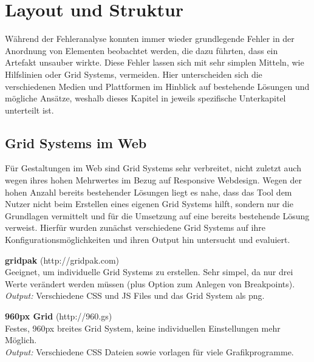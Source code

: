 
\chapter{Layout und Struktur} %

\label{LayoutStruktur} %



Während der Fehleranalyse konnten immer wieder grundlegende Fehler in der Anordnung von Elementen beobachtet werden, die dazu führten, dass ein Artefakt unsauber wirkte.
Diese Fehler lassen sich mit sehr simplen Mitteln, wie Hilfslinien oder Grid Systems, vermeiden.
Hier unterscheiden sich die verschiedenen Medien und Plattformen im Hinblick auf bestehende Lösungen und mögliche Ansätze, weshalb dieses Kapitel in jeweils spezifische Unterkapitel unterteilt ist.

\section{Grid Systems im Web}
Für Gestaltungen im Web sind Grid Systems sehr verbreitet, nicht zuletzt auch wegen ihres hohen Mehrwertes im Bezug auf Responsive Webdesign.
Wegen der hohen Anzahl bereits bestehender Lösungen liegt es nahe, dass das Tool dem Nutzer nicht beim Erstellen eines eigenen Grid Systems hilft, sondern nur die Grundlagen vermittelt und für die Umsetzung auf eine bereits bestehende Lösung verweist.
Hierfür wurden zunächst verschiedene Grid Systems auf ihre Konfigurationsmöglichkeiten und ihren Output hin untersucht und evaluiert.

\textbf{gridpak} (http://gridpak.com) \\
Geeignet, um individuelle Grid Systems zu erstellen. Sehr simpel, da nur drei Werte verändert werden müssen (plus Option zum Anlegen von Breakpoints). \\
\textit{Output:} Verschiedene CSS und JS Files und das Grid System als png.

\textbf{960px Grid} (http://960.gs) \\
Festes, 960px breites Grid System, keine individuellen Einstellungen mehr Möglich. \\
\textit{Output:} Verschiedene CSS Dateien sowie vorlagen für viele Grafikprogramme.

